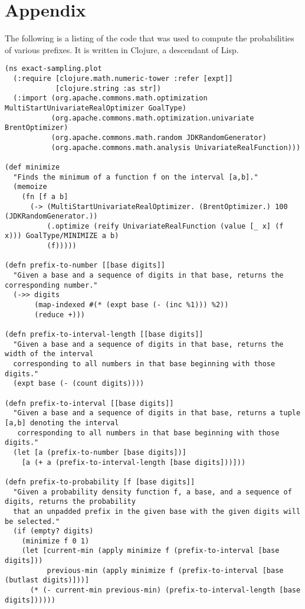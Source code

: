 \section{Appendix}

The following is a listing of the code that was used to compute the probabilities of various prefixes. It is written in Clojure, a descendant of Lisp.

\begin{lstlisting}[breaklines=true, basicstyle=\small]
(ns exact-sampling.plot
  (:require [clojure.math.numeric-tower :refer [expt]]
            [clojure.string :as str])
  (:import (org.apache.commons.math.optimization MultiStartUnivariateRealOptimizer GoalType)
           (org.apache.commons.math.optimization.univariate BrentOptimizer)
           (org.apache.commons.math.random JDKRandomGenerator)
           (org.apache.commons.math.analysis UnivariateRealFunction)))

(def minimize
  "Finds the minimum of a function f on the interval [a,b]."
  (memoize
    (fn [f a b]
      (-> (MultiStartUnivariateRealOptimizer. (BrentOptimizer.) 100 (JDKRandomGenerator.))
          (.optimize (reify UnivariateRealFunction (value [_ x] (f x))) GoalType/MINIMIZE a b)
          (f)))))

(defn prefix-to-number [[base digits]]
  "Given a base and a sequence of digits in that base, returns the corresponding number."
  (->> digits
       (map-indexed #(* (expt base (- (inc %1))) %2))
       (reduce +)))

(defn prefix-to-interval-length [[base digits]]
  "Given a base and a sequence of digits in that base, returns the width of the interval
  corresponding to all numbers in that base beginning with those digits."
  (expt base (- (count digits))))

(defn prefix-to-interval [[base digits]]
  "Given a base and a sequence of digits in that base, returns a tuple [a,b] denoting the interval
   corresponding to all numbers in that base beginning with those digits."
  (let [a (prefix-to-number [base digits])]
    [a (+ a (prefix-to-interval-length [base digits]))]))

(defn prefix-to-probability [f [base digits]]
  "Given a probability density function f, a base, and a sequence of digits, returns the probability
  that an unpadded prefix in the given base with the given digits will be selected."
  (if (empty? digits)
    (minimize f 0 1)
    (let [current-min (apply minimize f (prefix-to-interval [base digits]))
          previous-min (apply minimize f (prefix-to-interval [base (butlast digits)]))]
      (* (- current-min previous-min) (prefix-to-interval-length [base digits])))))


\end{lstlisting}
